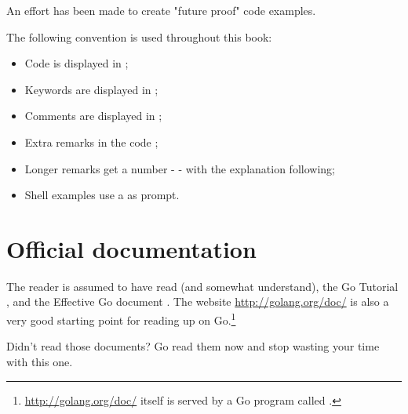 An effort has been made to create "future proof" code examples.

The following convention is used throughout this book:
\begin{itemize}
\item Code is displayed in ;
\item Keywords are displayed in ;
\item Comments are displayed in ;
\item Extra remarks in the code ;
\item Longer remarks get a number -  - with the explanation following;
\item Shell examples use a \pr{} as prompt.
\end{itemize}

\section{Official documentation}
The reader is assumed to have read (and somewhat understand), the
Go Tutorial \cite{go_tutorial}, and the Effective Go
document \cite{effective_go}. The
website \url{http://golang.org/doc/} is also a very good starting point
for reading up on Go.\footnote{\url{http://golang.org/doc/} itself is served by 
a Go program called .}

\begin{lbar}
\noindent Didn't read those documents? Go read them now and stop wasting your time
with this one.
\end{lbar}

